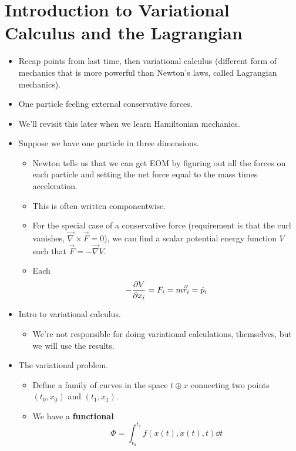 \documentclass[../notes.tex]{subfiles}
\begin{document}
\section{Introduction to Variational Calculus and the Lagrangian}
\begin{itemize}
    \item {}Recap points from last time, then variational calculus (different form of mechanics that is more powerful than Newton's laws, called Lagrangian mechanics).
    \item One particle feeling external conservative forces.
    \item We'll revisit this later when we learn Hamiltonian mechanics.
    \item Suppose we have one particle in three dimensions.
    \begin{itemize}
        \item Newton tells us that we can get EOM by figuring out all the forces on each particle and setting the net force equal to the mass times acceleration.
        \item This is often written componentwise.
        \item For the special case of a conservative force (requirement is that the curl vanishes, $\vec{\nabla}\times\vec{F}=0$), we can find a scalar potential energy function $V$ such that $\vec{F}=-\vec{\nabla}V$.
        \item Each
        \begin{equation*}
            -\pdv{V}{x_i} = F_i = m\vec{\ddot{r}}_i = \dot{p}_i
        \end{equation*}
    \end{itemize}
    \item Intro to variational calculus.
    \begin{itemize}
        \item We're not responsible for doing variational calculations, themselves, but we will use the results.
    \end{itemize}
    \item The variational problem.
    \begin{itemize}
        \item Define a family of curves in the space $t\oplus x$ connecting two points $(t_0,x_0)$ and $(t_1,x_1)$.
        \item We have a \textbf{functional}
        \begin{equation*}
            \Phi = \int_{t_0}^{t_1}f(x(t),\dot{x}(t),t)\dd{t}
        \end{equation*}

\end{itemize}
\end{itemize}
\end{document}
